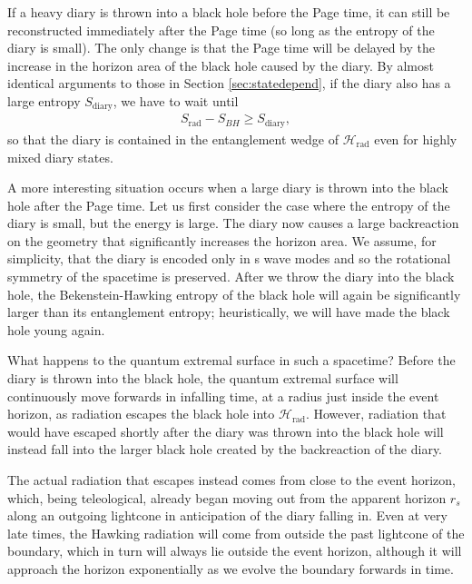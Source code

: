 \documentclass[11pt,a4paper]{article}
\newcommand{\Srad}{S_\text{rad} }
\begin{document}
If a heavy diary is thrown into a black hole before the Page time, it can still be reconstructed immediately after the Page time (so long as the entropy of the diary is small). The only change is that the Page time will be delayed by the increase in the horizon area of the black hole caused by the diary. By almost identical arguments to those in Section \ref{sec:statedepend}, if the diary also has a large entropy $S_\text{diary}$, we have to wait until
\begin{align}
\Srad - S_{BH} \geq S_\text{diary},
\end{align}
 so that the diary is contained in the entanglement wedge of $\mathcal{H}_\text{rad}$ even for highly mixed diary states. 

A more interesting situation occurs when a large diary is thrown into the black hole after the Page time. Let us first consider the case where the entropy of the diary is small, but the energy is large. The diary now causes a large backreaction on the geometry that significantly increases the horizon area. We assume, for simplicity, that the diary is encoded only in s wave modes and so the rotational symmetry of the spacetime is preserved. After we throw the diary into the black hole, the Bekenstein-Hawking entropy of the black hole will again be significantly larger than its entanglement entropy; heuristically, we will have made the black hole young again.

What happens to the quantum extremal surface in such a spacetime? Before the diary is thrown into the black hole, the quantum extremal surface will continuously move forwards in infalling time, at a radius just inside the event horizon, as radiation escapes the black hole into $\mathcal{H}_\text{rad}$. However, radiation that would have escaped shortly after the diary was thrown into the black hole will instead fall into the larger black hole created by the backreaction of the diary.

The actual radiation that escapes instead comes from close to the event horizon, which, being teleological, already began moving out from the apparent horizon $r_s$ along an outgoing lightcone in anticipation of the diary falling in. Even at very late times, the Hawking radiation will come from outside the past lightcone of the boundary, which in turn will always lie outside the event horizon, although it will approach the horizon exponentially as we evolve the boundary forwards in time. 
\end{document}
